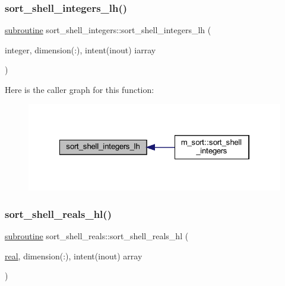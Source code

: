 \subsubsection{\texorpdfstring{sort\+\_\+shell\+\_\+integers\+\_\+lh()}{sort\_shell\_integers\_lh()}}
{\footnotesize\ttfamily \hyperlink{M__stopwatch_83_8txt_acfbcff50169d691ff02d4a123ed70482}{subroutine} sort\+\_\+shell\+\_\+integers\+::sort\+\_\+shell\+\_\+integers\+\_\+lh (\begin{DoxyParamCaption}\item[{integer, dimension(\+:), intent(inout)}]{iarray }\end{DoxyParamCaption})\hspace{0.3cm}{\ttfamily [private]}}

Here is the caller graph for this function\+:
\nopagebreak
\begin{figure}[H]
\begin{center}
\leavevmode
\includegraphics[width=322pt]{M__sort_8f90_a70ecc76a57b8e40ef2343a5e3eb6888e_icgraph}
\end{center}
\end{figure}
\mbox{\label{M__sort_8f90_a63fb4486f21d271616dd3d9ae7d1d90f}} 
\subsubsection{\texorpdfstring{sort\+\_\+shell\+\_\+reals\+\_\+hl()}{sort\_shell\_reals\_hl()}}
{\footnotesize\ttfamily \hyperlink{M__stopwatch_83_8txt_acfbcff50169d691ff02d4a123ed70482}{subroutine} sort\+\_\+shell\+\_\+reals\+::sort\+\_\+shell\+\_\+reals\+\_\+hl (\begin{DoxyParamCaption}\item[{\hyperlink{read__watch_83_8txt_abdb62bde002f38ef75f810d3a905a823}{real}, dimension(\+:), intent(inout)}]{array }\end{DoxyParamCaption})\hspace{0.3cm}{\ttfamily [private]}}

